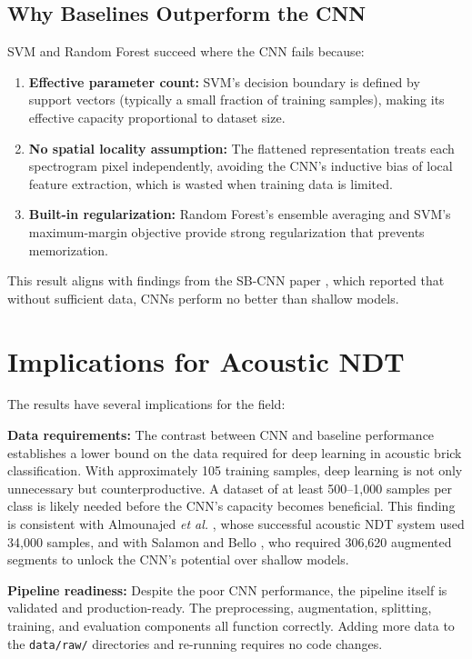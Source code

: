 \documentclass[12pt,a4paper,oneside]{report}
\begin{document}
\subsection{Why Baselines Outperform the CNN}

SVM and Random Forest succeed where the CNN fails because:
\begin{enumerate}
    \item \textbf{Effective parameter count:} SVM's decision boundary is defined by support vectors (typically a small fraction of training samples), making its effective capacity proportional to dataset size.
    \item \textbf{No spatial locality assumption:} The flattened representation treats each spectrogram pixel independently, avoiding the CNN's inductive bias of local feature extraction, which is wasted when training data is limited.
    \item \textbf{Built-in regularization:} Random Forest's ensemble averaging and SVM's maximum-margin objective provide strong regularization that prevents memorization.
\end{enumerate}

This result aligns with findings from the SB-CNN paper \cite{sbcnn2016}, which reported that without sufficient data, CNNs perform no better than shallow models.

\section{Implications for Acoustic NDT}

The results have several implications for the field:

\textbf{Data requirements:} The contrast between CNN and baseline performance establishes a lower bound on the data required for deep learning in acoustic brick classification. With approximately 105 training samples, deep learning is not only unnecessary but counterproductive. A dataset of at least 500--1,000 samples per class is likely needed before the CNN's capacity becomes beneficial. This finding is consistent with Almounajed \textit{et al.} \cite{rotor2023}, whose successful acoustic NDT system used 34,000 samples, and with Salamon and Bello \cite{sbcnn2016}, who required 306,620 augmented segments to unlock the CNN's potential over shallow models.

\textbf{Pipeline readiness:} Despite the poor CNN performance, the pipeline itself is validated and production-ready. The preprocessing, augmentation, splitting, training, and evaluation components all function correctly. Adding more data to the \texttt{data/raw/} directories and re-running requires no code changes.
\end{document}
